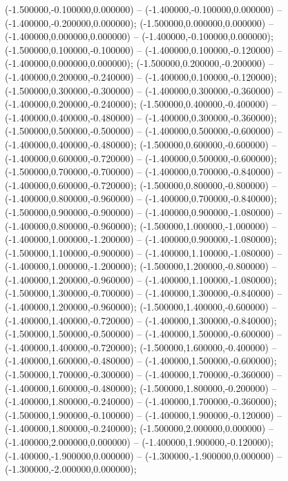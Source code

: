  (-1.500000,-0.100000,0.000000) -- (-1.400000,-0.100000,0.000000) -- (-1.400000,-0.200000,0.000000);
 (-1.500000,0.000000,0.000000) -- (-1.400000,0.000000,0.000000) -- (-1.400000,-0.100000,0.000000);
 (-1.500000,0.100000,-0.100000) -- (-1.400000,0.100000,-0.120000) -- (-1.400000,0.000000,0.000000);
 (-1.500000,0.200000,-0.200000) -- (-1.400000,0.200000,-0.240000) -- (-1.400000,0.100000,-0.120000);
 (-1.500000,0.300000,-0.300000) -- (-1.400000,0.300000,-0.360000) -- (-1.400000,0.200000,-0.240000);
 (-1.500000,0.400000,-0.400000) -- (-1.400000,0.400000,-0.480000) -- (-1.400000,0.300000,-0.360000);
 (-1.500000,0.500000,-0.500000) -- (-1.400000,0.500000,-0.600000) -- (-1.400000,0.400000,-0.480000);
 (-1.500000,0.600000,-0.600000) -- (-1.400000,0.600000,-0.720000) -- (-1.400000,0.500000,-0.600000);
 (-1.500000,0.700000,-0.700000) -- (-1.400000,0.700000,-0.840000) -- (-1.400000,0.600000,-0.720000);
 (-1.500000,0.800000,-0.800000) -- (-1.400000,0.800000,-0.960000) -- (-1.400000,0.700000,-0.840000);
 (-1.500000,0.900000,-0.900000) -- (-1.400000,0.900000,-1.080000) -- (-1.400000,0.800000,-0.960000);
 (-1.500000,1.000000,-1.000000) -- (-1.400000,1.000000,-1.200000) -- (-1.400000,0.900000,-1.080000);
 (-1.500000,1.100000,-0.900000) -- (-1.400000,1.100000,-1.080000) -- (-1.400000,1.000000,-1.200000);
 (-1.500000,1.200000,-0.800000) -- (-1.400000,1.200000,-0.960000) -- (-1.400000,1.100000,-1.080000);
 (-1.500000,1.300000,-0.700000) -- (-1.400000,1.300000,-0.840000) -- (-1.400000,1.200000,-0.960000);
 (-1.500000,1.400000,-0.600000) -- (-1.400000,1.400000,-0.720000) -- (-1.400000,1.300000,-0.840000);
 (-1.500000,1.500000,-0.500000) -- (-1.400000,1.500000,-0.600000) -- (-1.400000,1.400000,-0.720000);
 (-1.500000,1.600000,-0.400000) -- (-1.400000,1.600000,-0.480000) -- (-1.400000,1.500000,-0.600000);
 (-1.500000,1.700000,-0.300000) -- (-1.400000,1.700000,-0.360000) -- (-1.400000,1.600000,-0.480000);
 (-1.500000,1.800000,-0.200000) -- (-1.400000,1.800000,-0.240000) -- (-1.400000,1.700000,-0.360000);
 (-1.500000,1.900000,-0.100000) -- (-1.400000,1.900000,-0.120000) -- (-1.400000,1.800000,-0.240000);
 (-1.500000,2.000000,0.000000) -- (-1.400000,2.000000,0.000000) -- (-1.400000,1.900000,-0.120000);
 (-1.400000,-1.900000,0.000000) -- (-1.300000,-1.900000,0.000000) -- (-1.300000,-2.000000,0.000000);
